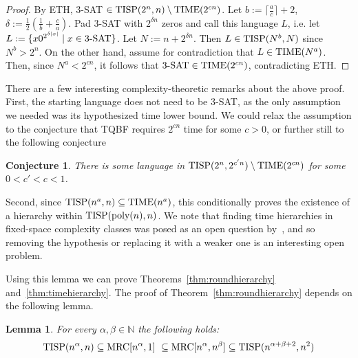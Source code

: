 \documentclass[11pt]{article}
\newtheorem{conjecture}{Conjecture}
\newtheorem{lemma}[theorem]{Lemma}
\theoremstyle{definition}
\theoremstyle{remark}
\newcommand{\mrc}{\textup{MRC}}
\newcommand{\TIME}{\textup{TIME}}
\newcommand{\TISP}{\textup{TISP}}
\begin{document}
\begin{proof}
By ETH, 3-SAT $\in \TISP(2^n, n)\setminus \TIME(2^{cn})$. Let
$b:=\lceil\frac{a}{c}\rceil+2$, $\delta:=\frac12(\frac1b+\frac{c}{a})$. Pad
3-SAT with $2^{\delta n}$ zeros and call this language $L$, i.e. let $L:=\{x
0^{2^{\delta|x|}} \mid x \in \textup{3-SAT}\}$. Let $N:=n+2^{\delta n}$. Then
$L\in \TISP(N^b, N)$ since $N^b > 2^n$. On the other hand, assume for
contradiction that $L \in \TIME(N^a)$. Then, since $N^a < 2^{cn}$, it follows
that $\textup{3-SAT} \in \TIME(2^{cn})$, contradicting ETH.
\end{proof}

There are a few interesting complexity-theoretic remarks about the above proof.
First, the starting language does not need to be 3-SAT, as the only assumption
we needed was its hypothesized time lower bound.  We could relax the assumption
to the conjecture that TQBF requires $2^{cn}$ time for some $c > 0$, or further
still to the following conjecture

\begin{conjecture} \label{conj:weaketh}
There is some language in $\TISP(2^n, 2^{c'n}) \setminus \TIME(2^{cn})$ for
some $0 < c' < c < 1$.
\end{conjecture}

Second, since $\TISP(n^a, n) \subseteq \TIME(n^a)$, this conditionally proves the
existence of a hierarchy within $\TISP(\textup{poly}(n), n)$. We note that
finding time hierarchies in fixed-space complexity classes was posed as an open
question by~\cite{WagnerW86}, and so removing the hypothesis or replacing it
with a weaker one is an interesting open problem.

Using this lemma we can prove Theorems~\ref{thm:roundhierarchy}
and~\ref{thm:timehierarchy}. The proof of Theorem~\ref{thm:roundhierarchy}
depends on the following lemma.

\begin{lemma} \label{lem:tisprelation}
For every $\alpha, \beta \in \mathbb N$ the following holds: $$ \TISP(n^\alpha,
n)  \subseteq \mrc[n^\alpha, 1] \ \subseteq \mrc[n^\alpha, n^\beta] \subseteq
\TISP(n^{\alpha+\beta+2}, n^2) $$
\end{lemma}
\end{document}
